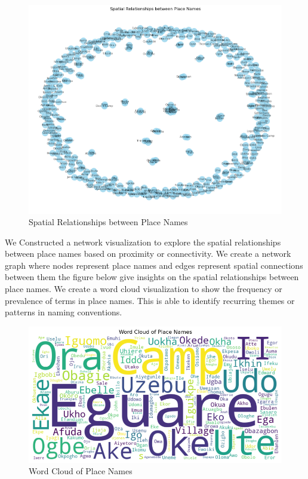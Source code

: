 \begin{figure}
    \centering
    \includegraphics[width=1\linewidth]{networkanalysis.png}
    \caption{Spatial Relationships between Place Names}
    \label{fig:network}
\end{figure}
We Constructed a network visualization to explore the spatial relationships between place names based on proximity or connectivity. We create a network graph where nodes represent place names and edges represent spatial connections between them the figure below give insights on the spatial relationships between place names.
\newpage
We create a word cloud visualization to show the frequency or prevalence of terms in place names. This is able to identify recurring themes or patterns in naming conventions.
\begin{figure}
    \centering
    \includegraphics[width=1\linewidth]{wordcloud.png}
    \caption{Word Cloud of Place Names}
    \label{fig:wordcloud}
\end{figure}
